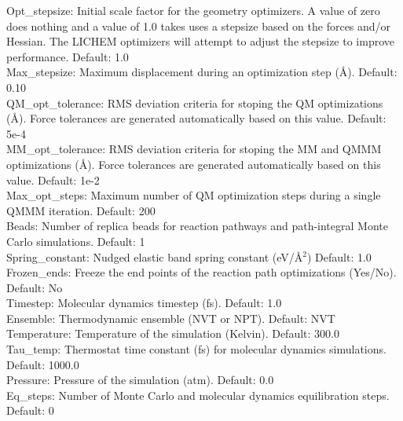 \documentclass[12pt]{report}
\begin{document}
Opt\_stepsize: Initial scale factor for the geometry optimizers.
A value of zero does nothing and a value of 1.0 takes uses a stepsize based
on the forces and/or Hessian. The LICHEM optimizers will attempt to adjust
the stepsize to improve performance.
Default: 1.0 \\

Max\_stepsize: Maximum displacement during an optimization step (\AA).
Default: 0.10 \\

QM\_opt\_tolerance: RMS deviation criteria for stoping the QM optimizations
(\AA).
Force tolerances are generated automatically based on this value.
Default: 5e-4 \\

MM\_opt\_tolerance: RMS deviation criteria for stoping the MM and QMMM
optimizations (\AA).
Force tolerances are generated automatically based on this value.
Default: 1e-2 \\

Max\_opt\_steps: Maximum number of QM optimization steps during a single
QMMM iteration.
Default: 200 \\

Beads: Number of replica beads for reaction pathways and path-integral
Monte Carlo simulations.
Default: 1 \\

Spring\_constant: Nudged elastic band spring constant (eV/\AA$^2$)
Default: 1.0 \\

Frozen\_ends: Freeze the end points of the reaction path optimizations 
(Yes/No).
Default: No \\

Timestep: Molecular dynamics timestep (fs).
Default: 1.0 \\

Ensemble: Thermodynamic ensemble (NVT or NPT).
Default: NVT \\

Temperature: Temperature of the simulation (Kelvin).
Default: 300.0 \\

Tau\_temp: Thermostat time constant (fs) for molecular dynamics simulations.
Default: 1000.0 \\

Pressure: Pressure of the simulation (atm).
Default: 0.0 \\

Eq\_steps: Number of Monte Carlo and molecular dynamics equilibration steps.
Default: 0 \\
\end{document}
